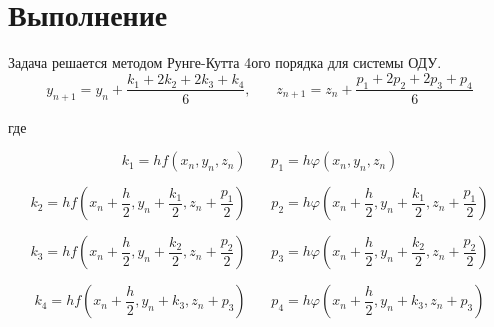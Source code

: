 \chapter*{Выполнение}

Задача решается методом Рунге-Кутта 4ого порядка для системы ОДУ.\\
\begin{equation}
	y_{n + 1} = y_n + \frac{k_1 + 2k_2 + 2k_3 + k_4}{6},
	~~~~~~~~z_{n + 1} = z_n + \frac{p_1 + 2p_2 + 2p_3 + p_4}{6}
\end{equation}

где

\begin{equation}
	k_1 = hf(x_n, y_n, z_n)    
	~~~~~~~~p_1 = h\varphi(x_n, y_n, z_n)
\end{equation}

\begin{equation}
	k_2 = hf(x_n + \frac{h}{2}, y_n + \frac{k_1}{2}, z_n + \frac{p_1}{2})    
	~~~~~~~~p_2 = h\varphi(x_n + \frac{h}{2}, y_n + \frac{k_1}{2}, z_n + \frac{p_1}{2})
\end{equation}

\begin{equation}
	k_3 = hf(x_n + \frac{h}{2}, y_n + \frac{k_2}{2}, z_n + \frac{p_2}{2})    
	~~~~~~~~p_3 = h\varphi(x_n + \frac{h}{2}, y_n + \frac{k_2}{2}, z_n + \frac{p_2}{2})
\end{equation}

\begin{equation}
	k_4 = hf(x_n + \frac{h}{2}, y_n + k_3, z_n + p_3)    
	~~~~~~~~p_4 = h\varphi(x_n + \frac{h}{2}, y_n + k_3, z_n + p_3)
\end{equation}


